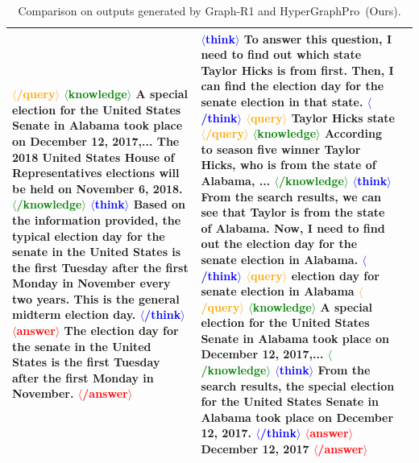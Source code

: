 \begin{table}[!t]
\begin{center}
{\begin{tabular}{p{2.8cm}|p{6.2cm}|p{5.4cm}}
\textcolor{orange}{$\langle$/query$\rangle$}\newline
\textcolor{green}{$\langle$knowledge$\rangle$}
A special election for the United States Senate in Alabama took place on December 12, 2017,...
The 2018 United States House of Representatives elections will be held on November 6, 2018.
\textcolor{green}{$\langle$/knowledge$\rangle$}\newline
\textcolor{blue}{$\langle$think$\rangle$}
Based on the information provided, the typical election day for the senate in the United States is the first Tuesday after the first Monday in November every two years. This is the general midterm election day.
\textcolor{blue}{$\langle$/think$\rangle$}\newline
\textcolor{red}{$\langle$answer$\rangle$}
The election day for the senate in the United States is the first Tuesday after the first Monday in November.
\textcolor{red}{$\langle$/answer$\rangle$}
            &
\textcolor{blue}{$\langle$think$\rangle$}
To answer this question, I need to find out which state Taylor Hicks is from first. Then, I can find the election day for the senate election in that state.
\textcolor{blue}{$\langle$/think$\rangle$}\newline
\textcolor{orange}{$\langle$query$\rangle$}
Taylor Hicks state
\textcolor{orange}{$\langle$/query$\rangle$}\newline
\textcolor{green}{$\langle$knowledge$\rangle$}
According to season five winner Taylor Hicks, who is from the state of Alabama, ...
\textcolor{green}{$\langle$/knowledge$\rangle$}\newline
\textcolor{blue}{$\langle$think$\rangle$}
From the search results, we can see that Taylor is from the state of Alabama. Now, I need to find out the election day for the senate election in Alabama.
\textcolor{blue}{$\langle$/think$\rangle$}\newline
\textcolor{orange}{$\langle$query$\rangle$}
election day for senate election in Alabama
\textcolor{orange}{$\langle$/query$\rangle$}\newline
\textcolor{green}{$\langle$knowledge$\rangle$}
A special election for the United States Senate in Alabama took place on December 12, 2017,...
\textcolor{green}{$\langle$/knowledge$\rangle$}\newline
\textcolor{blue}{$\langle$think$\rangle$}
From the search results, the special election for the United States Senate in Alabama took place on December 12, 2017.
\textcolor{blue}{$\langle$/think$\rangle$}\newline
\textcolor{red}{$\langle$answer$\rangle$}
December 12, 2017
\textcolor{red}{$\langle$/answer$\rangle$}\\
        \bottomrule
    \end{tabular}
    }
    \end{center}
    \vspace{-10pt}
    \caption{Comparison on outputs generated by Graph-R1 and HyperGraphPro~(Ours).
    }
    \label{tab:qual}
    \vspace{-12pt}
\end{table}

%          

